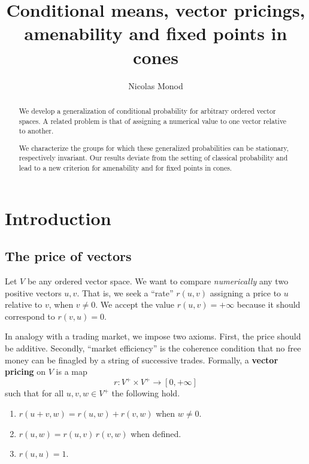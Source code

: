 \documentclass[11pt]{amsart}
\title[Conditional means, vector pricings and fixed points]{Conditional means, vector pricings,\\ amenability and fixed points in cones}
\author[Nicolas Monod]{Nicolas Monod}
\numberwithin{equation}{section}
\theoremstyle{definition}
\theoremstyle{definition}
\newcommand*{\lra}{\longrightarrow}
\begin{document}
\begin{abstract}
We develop a generalization of conditional probability for arbitrary ordered vector spaces. A related problem is that of assigning a numerical value to one vector relative to another.

We characterize the groups for which these generalized probabilities can be stationary, respectively invariant. Our results deviate from the setting of classical probability and lead to a new criterion for amenability and for fixed points in cones.
\end{abstract}
\maketitle
\thispagestyle{empty}


\section{Introduction}%
\subsection{The price of vectors}%
Let $V$ be any ordered vector space. We want to compare \emph{numerically} any two positive vectors $u,v$. That is, we seek a ``rate'' $r(u,v)$ assigning a price to $u$ relative to $v$, when $v\neq 0$. We accept the value $r(u,v)= +\infty$ because it should correspond to $r(v,u)=0$.

In analogy with a trading market, we impose two axioms. First, the price should be additive. Secondly, ``market efficiency'' is the coherence condition that no free money can be finagled by a string of successive trades.
Formally, a \textbf{vector pricing} on $V$ is a map
\begin{equation*}
r\colon V^+ \times V^+ \lra [0, +\infty]
\end{equation*}
such that for all $u,v,w\in V^+$ the following hold.

\smallskip
\begin{enumerate}[left=2\parindent, labelsep=\parindent, topsep=3pt, itemsep=3pt, label=\normalfont(VP\arabic*)]
\item $r(u+v, w) = r(u, w) + r(v, w)$ when $w\neq 0$. \label{pt:VP:add}
\item $ r(u,w) = r(u, v) \, r(v, w)$ when defined. \label{pt:VP:cocycle}
\item $r(u,u)=1$.\label{pt:VP:one}
\end{enumerate}
\end{document}
